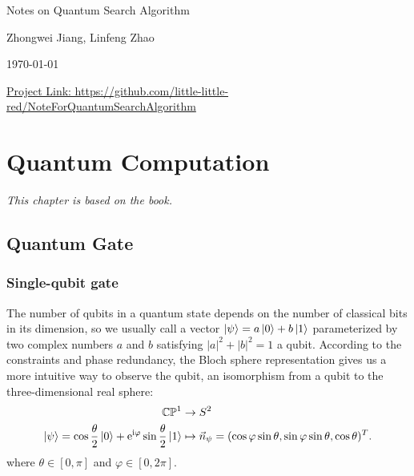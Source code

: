 \documentclass[a4paper,10pt]{book}
\numberwithin{equation}{section}
\begin{document}
\begin{titlepage}
    \thispagestyle{empty}
    \vspace*{\fill}
    \begin{center}
        \LARGE{Notes on Quantum Search Algorithm}

        \vspace{30pt}
        \large{Zhongwei Jiang, Linfeng Zhao}

        \vspace{16pt}
        \large{\today}

        \vspace{20pt}
        \href{https://github.com/little-little-red/NoteForQuantumSearchAlgorithm}{Project Link: https://github.com/little-little-red/NoteForQuantumSearchAlgorithm}

        \vspace{100pt}
    \end{center}
    \vspace*{\fill}
    \newpage
\end{titlepage}
\tableofcontents
\newpage
\chapter{Quantum Computation}

\textit{This chapter is based on the book\cite{nielsen2010}.}

\section{Quantum Gate}

\subsection{Single-qubit gate}

The number of qubits in a quantum state depends on the number of classical bits in its dimension, so we usually call a vector $\ket{\psi} = a\ket{0} + b\ket{1}$ parameterized by two complex numbers $a$ and $b$ satisfying $|a|^2 + |b|^2 = 1$ a qubit. According to the constraints and phase redundancy, the Bloch sphere representation gives us a more intuitive way to observe the qubit, an isomorphism from a qubit to the three-dimensional real sphere:
\begin{equation}\label{BlochSphereRepersentation}
    \begin{split}
        \mathbb{C}\mathbb{P}^{1}                                                                              & \to S^{2}                                                                            \\
        \ket{\psi} = \cos \frac{\theta}{2}\ket{0} + \mathrm{e}^{\mathrm{i}\varphi}\sin\frac{\theta}{2}\ket{1} & \mapsto \vec{n}_{\psi}=(\cos\varphi\sin\theta,\sin\varphi\sin\theta,\cos\theta)^{T}.
    \end{split}
\end{equation}
where $\theta\in\left[0,\pi\right]$ and $\varphi\in\left[0,2\pi\right]$.
\end{document}
